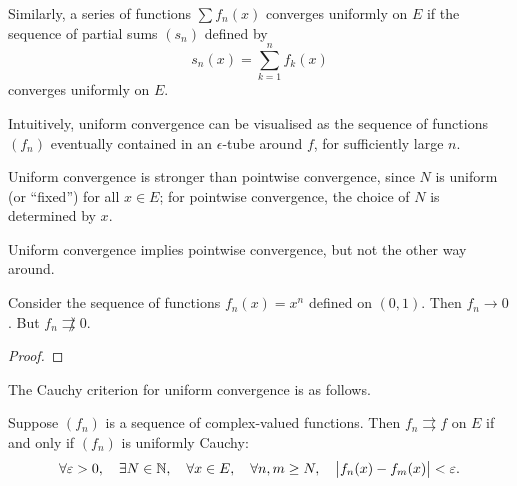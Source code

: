 Similarly, a series of functions $\sum f_n(x)$ converges uniformly on $E$ if the sequence of partial sums $(s_n)$ defined by
\[s_n(x)=\sum_{k=1}^{n}f_k(x)\]
converges uniformly on $E$.

\begin{remark}
Intuitively, uniform convergence can be visualised as the sequence of functions $(f_n)$ eventually contained in an $\epsilon$-tube around $f$, for sufficiently large $n$. 
\end{remark}

Uniform convergence is stronger than pointwise convergence, since $N$ is uniform (or ``fixed'') for all $x\in E$; for pointwise convergence, the choice of $N$ is determined by $x$.

\begin{remark}
Uniform convergence implies pointwise convergence, but not the other way around.
\end{remark}

\begin{example}
Consider the sequence of functions $f_n(x)=x^n$ defined on $(0,1)$. Then $f_n\to0$. But $f_n\not\rightrightarrows 0$.
\begin{proof}

\end{proof}
\end{example}

The Cauchy criterion for uniform convergence is as follows.

\begin{lemma}\label{lemma:uniform-convergence-cauchy}
Suppose $(f_n)$ is a sequence of complex-valued functions. Then $f_n\rightrightarrows f$ on $E$ if and only if $(f_n)$ is uniformly Cauchy:
\[\forall\varepsilon>0,\quad\exists N\in\mathbb N,\quad\forall x\in E,\quad\forall n,m\ge N,\quad\left|f_n(x)-f_m(x)\right|<\varepsilon.\]
\end{lemma}

